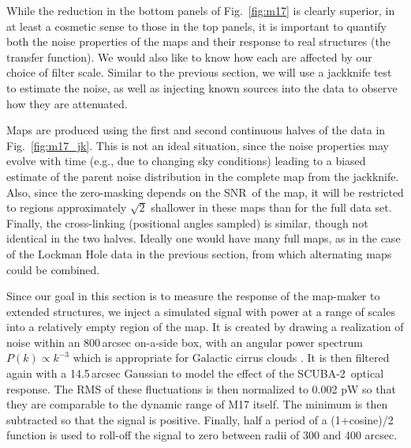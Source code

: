\documentclass[useAMS,usenatbib,nofootinbib]{mn2e}
\newcommand{\snr}{SNR}
\newcommand{\scuba}{SCUBA-2}
\begin{document}
While the reduction in the bottom panels of Fig.~\ref{fig:m17} is
clearly superior, in at least a cosmetic sense to those in the top
panels, it is important to quantify both the noise properties of the
maps and their response to real structures (the transfer function). We
would also like to know how each are affected by our choice of filter
scale.  Similar to the previous section, we will use a jackknife test
to estimate the noise, as well as injecting known sources into the
data to observe how they are attenuated.

Maps are produced using the first and second continuous halves of the
data in Fig.~\ref{fig:m17_jk}. This is not an ideal situation, since
the noise properties may evolve with time (e.g., due to changing sky
conditions) leading to a biased estimate of the parent noise
distribution in the complete map from the jackknife. Also, since the
zero-masking depends on the \snr\ of the map, it will be restricted to
regions approximately $\sqrt{2}$ shallower in these maps than for the
full data set. Finally, the cross-linking (positional angles sampled)
is similar, though not identical in the two halves. Ideally one would
have many full maps, as in the case of the Lockman Hole data in the
previous section, from which alternating maps could be combined.

Since our goal in this section is to measure the response of the
map-maker to extended structures, we inject a simulated signal with
power at a range of scales into a relatively empty region of the map.
It is created by drawing a realization of noise within an 800\,arcsec
on-a-side box, with an angular power spectrum $P(k) \propto k^{-3}$
which is appropriate for Galactic cirrus clouds
\citep[e.g.][]{gautier1992}. It is then filtered again with a
14.5\,arcsec Gaussian to model the effect of the \scuba\ optical
response. The RMS of these fluctuations is then normalized to 0.002 pW
so that they are comparable to the dynamic range of M17 itself. The
minimum is then subtracted so that the signal is positive. Finally,
half a period of a (1+cosine)/2 function is used to roll-off the
signal to zero between radii of 300 and 400 arcsec.
\end{document}
